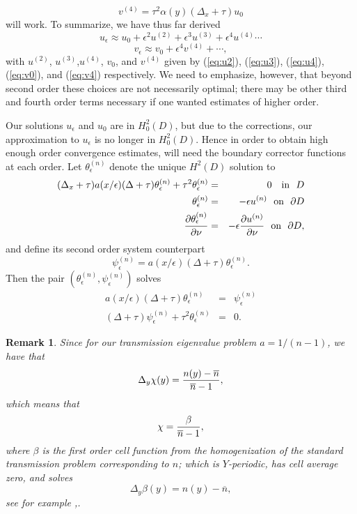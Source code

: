 \documentclass[12pt]{article}
\newtheorem{remark}{Remark}
\begin{document}
\begin{equation}\label{eq:v4} v^{(4)} = \tau^2 \alpha(y) (\Delta_x +\tau) u_0  \end{equation}
will work. To summarize, we have thus far derived 
$$ u_\epsilon \approx u_0 +\epsilon^2 u^{(2)} +\epsilon^3 u^{(3)} +\epsilon^4 u^{(4)} \cdots $$
$$ v_\epsilon \approx v_0 + \epsilon^4 v^{(4)}+\cdots, $$
with $u^{(2)}$, $u^{(3)}$,$u^{(4)}$, $v_0$,  and $v^{(4)}$ given by (\ref{eq:u2}), (\ref{eq:u3}), (\ref{eq:u4}), (\ref{eq:v0}), and (\ref{eq:v4}) respectively. We need to emphasize, however, that beyond second order these choices are not necessarily optimal; there may be other third and fourth order terms necessary if one wanted estimates of higher order. 

\noindent
Our solutions $u_\epsilon$ and $u_0$ are in $H^2_0(D)$,  but due to the corrections, our approximation to $u_\epsilon$ is no longer in $H^2_0(D)$. Hence in order to obtain high enough order convergence estimates, will need the boundary corrector functions at each order. Let $\theta_\epsilon^{(n)}$ denote the unique $H^2(D)$ solution to 
\begin{eqnarray}   (\Delta_x +\tau) a(x/\epsilon) (\Delta +\tau) \theta_\epsilon^{(n)} +\tau^2\theta_\epsilon^{(n)} &=&  0 \ \ \ \mbox{in}\ \ D \label{thetaeps2} \\ 
\theta_\epsilon^{(n)} &=& -\epsilon u^{(n)} \ \ \mbox{on}\ \ \partial D \nonumber \\ {\partial  \theta_\epsilon^{(n)} \over{\partial\nu}}&=& -\epsilon {\partial u^{(n)}\over{\partial\nu}}  \ \ \mbox{on}\ \ \partial D,\nonumber\end{eqnarray}
and define its second order system counterpart 
\begin{equation}\label{eq:psieps} \psi_\epsilon^{(n)} = a(x/\epsilon) (\Delta +\tau) \theta_\epsilon^{(n)} .\end{equation}
Then the pair $(\theta^{(n)}_\epsilon, \psi^{(n)}_\epsilon)$ solves
\begin{eqnarray}\label{eq:uepssystem}  a(x/\epsilon) (\Delta +\tau )\theta^{(n)}_\epsilon  &=& \psi^{(n)}_\epsilon  \\ (\Delta +\tau )\psi^{(n)}_\epsilon  +\tau^2 \theta^{(n)}_\epsilon &=& 0. \nonumber\end{eqnarray}
\begin{remark} \label{rem} Since for our transmission eigenvalue problem $a= 1/(n-1)$, we have that 
\begin{equation}\label{betaeq2}  \Delta_y \chi(y) = {n(y) -\overline{n}\over{\overline{n}-1}} , \end{equation}
which means that $$\chi ={\beta \over{\overline{n}-1}},$$ where $\beta$ is the first order cell function from the homogenization of the standard transmission problem corresponding to $n$; which is $Y$-periodic, has cell average zero, and solves \begin{equation}\label{betaeq3}  \Delta_y \beta(y) = {n(y) -\overline{n}} , \end{equation}
see for example \cite{CaGuMoPa},\cite{CaMoPa}.
\end{remark} 
\end{document}

